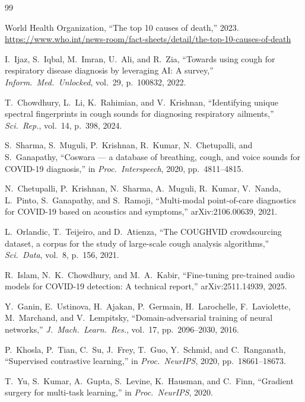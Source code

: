 \documentclass[journal]{IEEEtran}
\begin{document}
\begin{thebibliography}{99}

World Health Organization, ``The top 10 causes of death,'' 2023.
\url{https://www.who.int/news-room/fact-sheets/detail/the-top-10-causes-of-death}

I.~Ijaz, S.~Iqbal, M.~Imran, U.~Ali, and R.~Zia,
``Towards using cough for respiratory disease diagnosis by leveraging AI: A survey,''
\emph{Inform.\ Med.\ Unlocked}, vol.~29, p.~100832, 2022.

T.~Chowdhury, L.~Li, K.~Rahimian, and V.~Krishnan,
``Identifying unique spectral fingerprints in cough sounds for diagnosing
respiratory ailments,'' \emph{Sci.\ Rep.}, vol.~14, p.~398, 2024.

S.~Sharma, S.~Muguli, P.~Krishnan, R.~Kumar, N.~Chetupalli, and
S.~Ganapathy,
``Coswara --- a database of breathing, cough, and voice sounds for
COVID-19 diagnosis,'' in \emph{Proc.\ Interspeech}, 2020, pp.~4811--4815.

N.~Chetupalli, P.~Krishnan, N.~Sharma, A.~Muguli, R.~Kumar,
V.~Nanda, L.~Pinto, S.~Ganapathy, and S.~Ramoji,
``Multi-modal point-of-care diagnostics for COVID-19 based on
acoustics and symptoms,'' arXiv:2106.00639, 2021.

L.~Orlandic, T.~Teijeiro, and D.~Atienza,
``The COUGHVID crowdsourcing dataset, a corpus for the study of large-scale
cough analysis algorithms,'' \emph{Sci.\ Data}, vol.~8, p.~156, 2021.

R.~Islam, N.~K.~Chowdhury, and M.~A.~Kabir,
``Fine-tuning pre-trained audio models for COVID-19 detection: A technical report,''
arXiv:2511.14939, 2025.

Y.~Ganin, E.~Ustinova, H.~Ajakan, P.~Germain, H.~Larochelle,
F.~Laviolette, M.~Marchand, and V.~Lempitsky,
``Domain-adversarial training of neural networks,''
\emph{J.\ Mach.\ Learn.\ Res.}, vol.~17, pp.~2096--2030, 2016.

P.~Khosla, P.~Tian, C.~Su, J.~Frey, T.~Guo, Y.~Schmid, and C.~Ranganath,
``Supervised contrastive learning,''
in \emph{Proc.\ NeurIPS}, 2020, pp.~18661--18673.

T.~Yu, S.~Kumar, A.~Gupta, S.~Levine, K.~Hausman, and C.~Finn,
``Gradient surgery for multi-task learning,''
in \emph{Proc.\ NeurIPS}, 2020.


\end{thebibliography}
\end{document}
